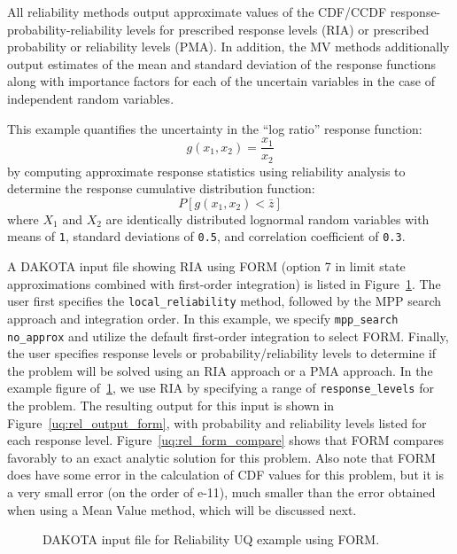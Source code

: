 All reliability methods output approximate values of the CDF/CCDF
response-probability-reliability levels for prescribed response levels
(RIA) or prescribed probability or reliability levels (PMA).  In
addition, the MV methods additionally output estimates of the mean and
standard deviation of the response functions along with importance
factors for each of the uncertain variables in the case of independent
random variables.

This example quantifies the uncertainty in the ``log ratio'' response
function:
\begin{equation}
g(x_1,x_2) = \frac{x_1}{x_2}
\end{equation}
by computing approximate response statistics using reliability
analysis to determine the response cumulative distribution function:
\begin{equation}
P[g(x_1,x_2) < \bar{z}]
\end{equation}
where $X_1$ and $X_2$ are identically distributed lognormal random
variables with means of \texttt{1}, standard deviations of
\texttt{0.5}, and correlation coefficient of \texttt{0.3}.

A DAKOTA input file showing RIA using FORM (option 7 in limit state
approximations combined with first-order integration) is listed in
Figure~\ref{uq:rel_input_form}.  The user first specifies the 
\texttt{local\_reliability} method, followed by the MPP search 
approach and integration order.  In this example, we specify
\texttt{mpp\_search no\_approx} and utilize the default first-order
integration to select FORM.  Finally, the user specifies response
levels or probability/reliability levels to determine if the problem
will be solved using an RIA approach or a PMA approach.  In the
example figure of~\ref{uq:rel_input_form}, we use RIA by specifying a range
of \texttt{response\_levels} for the problem.  The resulting output
for this input is shown in Figure~\ref{uq:rel_output_form}, with probability
and reliability levels listed for each response level.
Figure~\ref{uq:rel_form_compare} shows that FORM compares favorably to an
exact analytic solution for this problem.  Also note that FORM does have 
some error in the calculation of CDF values for this problem, but it is 
a very small error (on the order of e-11), much smaller than the 
error obtained when using a Mean Value method, which will be discussed next.


\begin{figure}
  \centering
  \begin{bigbox}
    \begin{small}
    \end{small}
  \end{bigbox}
\caption{DAKOTA input file for Reliability UQ example using FORM.}
\label{uq:rel_input_form}
\end{figure}

